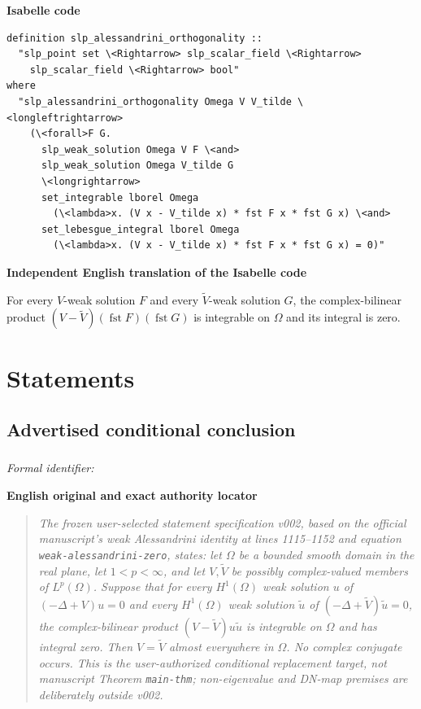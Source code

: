 \documentclass[10pt,oneside]{article}
\newenvironment{sourcequote}{\begin{quote}\itshape}{\end{quote}}
\newcommand{\reviewlabel}[1]{\par\smallskip\noindent\textsf{\bfseries #1}\par\smallskip}
\begin{document}
\reviewlabel{Isabelle code}
\begin{lstlisting}
definition slp_alessandrini_orthogonality ::
  "slp_point set \<Rightarrow> slp_scalar_field \<Rightarrow>
    slp_scalar_field \<Rightarrow> bool"
where
  "slp_alessandrini_orthogonality Omega V V_tilde \<longleftrightarrow>
    (\<forall>F G.
      slp_weak_solution Omega V F \<and>
      slp_weak_solution Omega V_tilde G
      \<longrightarrow>
      set_integrable lborel Omega
        (\<lambda>x. (V x - V_tilde x) * fst F x * fst G x) \<and>
      set_lebesgue_integral lborel Omega
        (\<lambda>x. (V x - V_tilde x) * fst F x * fst G x) = 0)"
\end{lstlisting}

\reviewlabel{Independent English translation of the Isabelle code}
For every $V$-weak solution $F$ and every $\widetilde V$-weak solution $G$, the complex-bilinear product $(V-\widetilde V)(\operatorname{fst}F)(\operatorname{fst}G)$ is integrable on $\Omega$ and its integral is zero.

\clearpage
\section{Statements}
\subsection{Advertised conditional conclusion}
\subsubsection{\texttt{}}
\noindent\textit{Formal identifier:} \texttt{}

\reviewlabel{English original and exact authority locator}
\begin{sourcequote}
The frozen user-selected statement specification v002, based on the official
manuscript's weak Alessandrini identity at lines 1115--1152 and equation
\texttt{weak-alessandrini-zero}, states: let $\Omega$ be a bounded smooth
domain in the real plane, let $1<p<\infty$, and let $V,\widetilde V$ be
possibly complex-valued members of $L^p(\Omega)$. Suppose that for every
$H^1(\Omega)$ weak solution $u$ of $(-\Delta+V)u=0$ and every
$H^1(\Omega)$ weak solution $\widetilde u$ of
$(-\Delta+\widetilde V)\widetilde u=0$, the complex-bilinear product
$(V-\widetilde V)u\widetilde u$ is integrable on $\Omega$ and has integral
zero. Then $V=\widetilde V$ almost everywhere in $\Omega$. No complex
conjugate occurs. This is the user-authorized conditional replacement target,
not manuscript Theorem \texttt{main-thm}; non-eigenvalue and DN-map premises
are deliberately outside v002.
\end{sourcequote}
\end{document}
